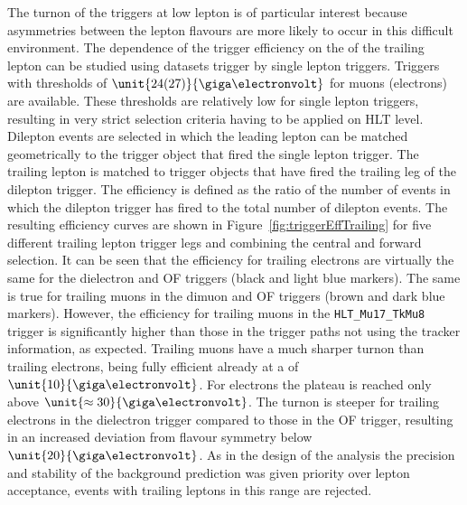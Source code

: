 The turnon of the triggers at low lepton \pt is of particular interest because asymmetries between the lepton flavours are more likely to occur in this difficult environment. The dependence of the trigger efficiency on the \pt of the trailing lepton can be studied using datasets trigger by single lepton triggers. Triggers with \pt thresholds of $\unit{24(27)}{\giga\electronvolt}$ for muons (electrons) are available. These thresholds are relatively low for single lepton triggers, resulting in very strict selection criteria having to be applied on HLT level. Dilepton events are selected in which the leading lepton can be matched  geometrically to the trigger object that fired the single lepton trigger. The trailing lepton is matched to trigger objects that have fired the trailing leg of the dilepton trigger. The efficiency is defined as the ratio of the number of events in which the dilepton trigger has fired to the total number of dilepton events. The resulting efficiency curves are shown in Figure~\ref{fig:triggerEffTrailing} for five different trailing lepton trigger legs and combining the central and forward selection. It can be seen that the efficiency for trailing electrons are virtually the same for the dielectron and OF triggers (black and light blue markers). The same is true for trailing muons in the dimuon and OF triggers (brown and dark blue markers). However, the efficiency for trailing muons in the \verb+HLT_Mu17_TkMu8+ trigger is significantly higher than those in the trigger paths not using the tracker information, as expected. Trailing muons have a much sharper turnon than trailing electrons, being fully efficient already at a \pt of $\unit{10}{\giga\electronvolt}$. For electrons the plateau is reached only above $\unit{\approx 30}{\giga\electronvolt}$. The turnon is steeper for trailing electrons in the dielectron trigger compared to those in the OF trigger, resulting in an increased deviation from flavour symmetry below $\unit{20}{\giga\electronvolt}$. As in the design of the analysis the precision and stability of the background prediction was given priority over lepton acceptance, events with trailing leptons in this \pt range are rejected.  
